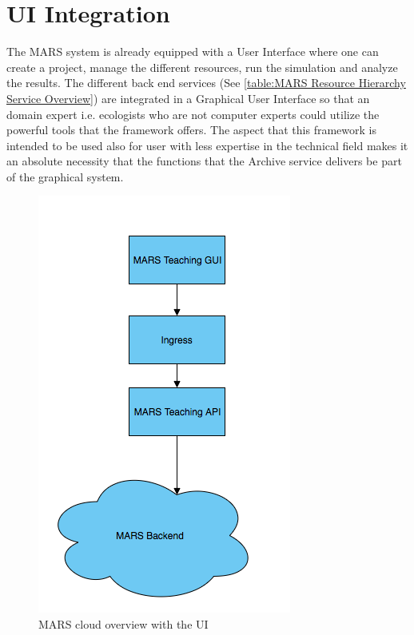 \section{UI Integration}
The MARS system is already equipped with a User Interface where one can create a project, manage the different resources, run the simulation and
analyze the results. The different back end services (See \ref{table:MARS Resource Hierarchy Service Overview}) are integrated in a Graphical
User Interface so that an domain expert i.e. ecologists who are not computer experts could utilize the powerful tools that the framework offers.
The aspect that this framework is intended to be used also for user with less expertise in the technical field makes it an absolute necessity that
the functions that the Archive service delivers be part of the graphical system.

\begin{figure}[H]
    \centering \includegraphics[scale=0.6]{grafiken/marsIngress.png}
    \caption{MARS cloud overview with the UI}
    \label{fig:marsCloudUI}
\end{figure}

